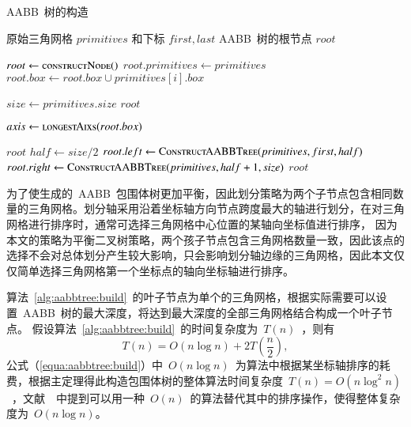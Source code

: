 \begin{algorithm}[H]
\small
\caption{AABB~树的构造}
\label{alg:aabbtree:build}
\begin{algorithmic}[1]
\Require
原始三角网格 $primitives$ 和下标 $first, last$
\Ensure
AABB~树的根节点 $root$

  \State $root \gets \Call{constructNode()}{}$ 
  \State $root.primitives \gets primitives$
      \State $root.box \gets root.box \cup primitives[i].box$
  \EndFor

  \State $size \gets primitives.size$  
  \State \Return $root$
  \EndIf

  \State $axis \gets \Call{longestAixs}{root.box}$
  
      \State \Return $root$
  \EndIf
  \State $half \gets size / 2 $
  \State $root.left \gets \Call{ConstructAABBTree}{primitives, first, half}$
  \State {}
  \State $root.right \gets \Call{ConstructAABBTree}{primitives, half+1, size}$ 
  \State \Return $root$
\EndFunction
\end{algorithmic}
\end{algorithm}

为了使生成的~AABB~包围体树更加平衡，因此划分策略为两个子节点包含相同数量的三角网格。划分轴采用沿着坐标轴方向节点跨度最大的轴进行划分，在对三角网格进行排序时，通常可选择三角网格中心位置的某轴向坐标值进行排序，
因为本文的策略为平衡二叉树策略，两个孩子节点包含三角网格数量一致，因此该点的选择不会对总体划分产生较大影响，只会影响划分轴边缘的三角网格，因此本文仅仅简单选择三角网格第一个坐标点的轴向坐标轴进行排序。

算法~\ref{alg:aabbtree:build}~的叶子节点为单个的三角网格，根据实际需要可以设置~AABB~树的最大深度，将达到最大深度的全部三角网格结合构成一个叶子节点。
假设算法~\ref{alg:aabbtree:build}~的时间复杂度为~$T(n)$~，则有
\begin{equation}
  T(n) = O(n \log n ) + 2T(\frac{n}{2}),
\label{equa:aabbtree:build}
\end{equation}
公式（\ref{equa:aabbtree:build}）中~$O(n \log n)$~为算法中根据某坐标轴排序的耗费，根据主定理得此构造包围体树的整体算法时间复杂度~$T(n)=O(n\log^2n)$~，文献~~中提到可以用一种~$O(n)$~的算法替代其中的排序操作，使得整体复杂度为~$O(n\log n)$。

